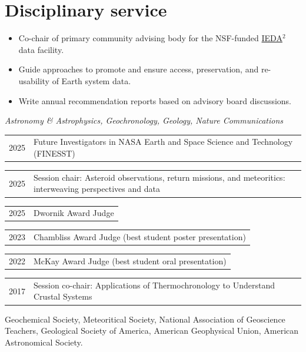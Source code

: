 \section{Disciplinary service}

\begin{itemize}
	\item Co-chair of primary community advising body for the NSF-funded \href{https://www.iedadata.org/}{IEDA$^2$} data facility.
	\item Guide approaches to promote and ensure access, preservation, and re-usability of Earth system data.
	\item Write annual recommendation reports based on advisory board discussions. 
\end{itemize}

\textit{Astronomy \& Astrophysics, Geochronology, Geology, Nature Communications}

\begin{tabular}{ll} 
	2025 & Future Investigators in NASA Earth and Space Science and Technology (FINESST)
\end{tabular}


\begin{tabular}{ll} 
	2025 & Session chair: \small Asteroid observations, return missions, and meteoritics: interweaving perspectives and data
\end{tabular}

\begin{tabular}{ll} 
	2025 & Dwornik Award Judge
\end{tabular}

\begin{tabular}{ll} 
	2023 & Chambliss Award Judge (best student poster presentation)
\end{tabular}

\begin{tabular}{ll} 
	2022 & 	McKay Award Judge (best student oral presentation)
\end{tabular}

\begin{tabular}{ll} 
	2017 & 	Session co-chair: \small Applications of Thermochronology to Understand Crustal Systems
\end{tabular}

Geochemical Society, Meteoritical Society, National Association of Geoscience Teachers, Geological Society of America, American Geophysical Union, American Astronomical Society.